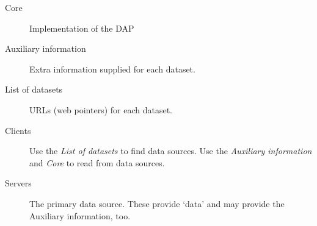 
\begin{description}
\item[Core] Implementation of the DAP
\item[Auxiliary information] Extra information supplied for each dataset. 
\item[List of datasets] URLs (web pointers) for each dataset.
\item[Clients] Use the \emph{List of datasets} to find data sources. Use the
  \emph{Auxiliary information} and \emph{Core} to read from data sources.
\item[Servers] The primary data source. These provide `data' and may provide
  the Auxiliary information, too.
\end{description}